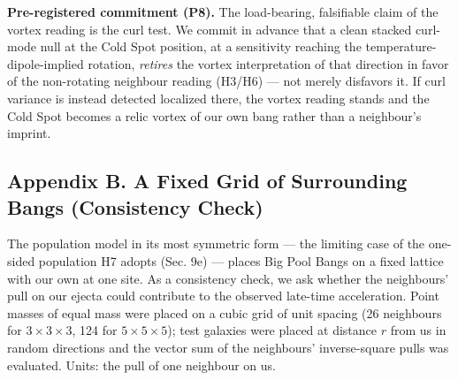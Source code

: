 \documentclass[
]{article}
\begin{document}
\textbf{Pre-registered commitment (P8).} The load-bearing, falsifiable
claim of the vortex reading is the curl test. We commit in advance that
a clean stacked curl-mode null at the Cold Spot position, at a
sensitivity reaching the temperature-dipole-implied rotation,
\emph{retires} the vortex interpretation of that direction in favor of
the non-rotating neighbour reading (H3/H6) --- not merely disfavors it.
If curl variance is instead detected localized there, the vortex reading
stands and the Cold Spot becomes a relic vortex of our own bang rather
than a neighbour's imprint.

\hypertarget{appendix-b.-a-fixed-grid-of-surrounding-bangs-consistency-check}{%
\subsection{\texorpdfstring{\textbf{Appendix B. A Fixed Grid of
Surrounding Bangs (Consistency
Check)}}{Appendix B. A Fixed Grid of Surrounding Bangs (Consistency Check)}}\label{appendix-b.-a-fixed-grid-of-surrounding-bangs-consistency-check}}

The population model in its most symmetric form --- the limiting case of
the one-sided population H7 adopts (Sec. 9e) --- places Big Pool Bangs
on a fixed lattice with our own at one site. As a consistency check, we
ask whether the neighbours' pull on our ejecta could contribute to the
observed late-time acceleration. Point masses of equal mass were placed
on a cubic grid of unit spacing (26 neighbours for \(3\times3\times3\),
124 for \(5\times5\times5\)); test galaxies were placed at distance
\(r\) from us in random directions and the vector sum of the neighbours'
inverse-square pulls was evaluated. Units: the pull of one neighbour on
us.
\end{document}
